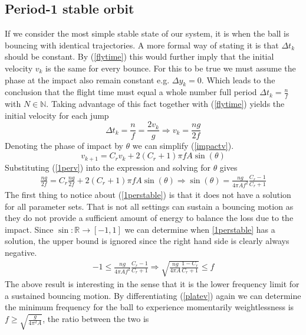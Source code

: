 \documentclass[12pt,oneside,a4paper]{article}
\numberwithin{equation}{section}
\begin{document}
{{{{\subsection{Period-1 stable orbit}
If we consider the most simple stable state of our system, it is when the ball is bouncing with identical trajectories. A more formal way of stating it is that $\Delta t_k$ should be constant. By  (\ref{flytime}) this would further imply that the initial velocity $v_k$ is the same for every bounce. For this to be true we must assume the phase at the impact also remain constant e.g. $\Delta y_k=0$. Which leads to the conclusion that the flight time must equal a whole number full period $\Delta t_k = \frac{n}{f}$ with $N\in \mathbb{N}$. Taking advantage of this fact together with (\ref{flytime}) yields the initial velocity for each jump
\begin{equation}
	\Delta t_k = \frac{n}{f} = \frac{2v_k}{g} \Rightarrow v_k = \frac{ng}{2f}
	\label{1perv}
\end{equation}
Denoting the phase of impact by $\theta$ we can simplify (\ref{impactv}).
\begin{equation}
	v_{k+1} = C_rv_k+2(C_r+1)\pi fA \sin(\theta)
\end{equation}
Substituting (\ref{1perv}) into the expression and solving for $\theta$ gives
\begin{align}
	\frac{ng}{2f} = C_r\frac{ng}{2f}+2(C_r+1)\pi fA \sin(\theta) \Rightarrow \sin(\theta) = \frac{ng}{4\pi Af^2 }\frac{C_r-1}{C_r+1}
	\label{1perstable}
\end{align}
The first thing to notice about (\ref{1perstable}) is that it does not have a solution for all parameter sets. That is not all settings can sustain a bouncing motion as they do not provide a sufficient amount of energy to balance the loss due to the impact. Since $\sin: \mathbb{R} \rightarrow [-1,1]$ we can determine when \eqref{1perstable} has a solution, the upper bound is ignored since the right hand side is clearly always negative.
\begin{align}
	-1 \le \frac{ng}{4\pi Af^2 }\frac{C_r-1}{C_r+1} \Rightarrow \sqrt{\frac{ng}{4\pi A}\frac{1-C_r}{C_r+1}} \le f
\end{align}
The above result is interesting in the sense that it is the lower frequency limit for a sustained bouncing motion. By differentiating (\ref{platev}) again we can determine the minimum frequency for the ball to experience momentarily weightlessness is $f\ge\sqrt{\frac{g}{4\pi^2A}}$, the ratio between the two is
\begin{equation}

\end{equation}}}}}
\end{document}
